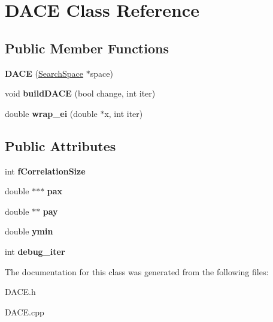 \hypertarget{class_d_a_c_e}{}\section{D\+A\+C\+E Class Reference}
\label{class_d_a_c_e}
\subsection*{Public Member Functions}
\begin{DoxyCompactItemize}
\item 
\hypertarget{class_d_a_c_e_ad065d6a5ee8dab7471f3f24982c25c81}{}{\bfseries D\+A\+C\+E} (\hyperlink{class_search_space}{Search\+Space} $\ast$space)\label{class_d_a_c_e_ad065d6a5ee8dab7471f3f24982c25c81}

\item 
\hypertarget{class_d_a_c_e_a2dab075ce7d90d2a0ddf239ad3af9166}{}void {\bfseries build\+D\+A\+C\+E} (bool change, int iter)\label{class_d_a_c_e_a2dab075ce7d90d2a0ddf239ad3af9166}

\item 
\hypertarget{class_d_a_c_e_aa5948a37a9acb0c8cfa511ff11e60ab2}{}double {\bfseries wrap\+\_\+ei} (double $\ast$x, int iter)\label{class_d_a_c_e_aa5948a37a9acb0c8cfa511ff11e60ab2}

\end{DoxyCompactItemize}
\subsection*{Public Attributes}
\begin{DoxyCompactItemize}
\item 
\hypertarget{class_d_a_c_e_a9b51bc799fddc33adc55d1554e9724b8}{}int {\bfseries f\+Correlation\+Size}\label{class_d_a_c_e_a9b51bc799fddc33adc55d1554e9724b8}

\item 
\hypertarget{class_d_a_c_e_a078309f70c44c2375e61eff0dfa01937}{}double $\ast$$\ast$$\ast$ {\bfseries pax}\label{class_d_a_c_e_a078309f70c44c2375e61eff0dfa01937}

\item 
\hypertarget{class_d_a_c_e_a63d1a43f2515a0ef3307d0fec42c19f0}{}double $\ast$$\ast$ {\bfseries pay}\label{class_d_a_c_e_a63d1a43f2515a0ef3307d0fec42c19f0}

\item 
\hypertarget{class_d_a_c_e_a5cdb4cbf1f85f1aaf2d4b07ff7d389bb}{}double {\bfseries ymin}\label{class_d_a_c_e_a5cdb4cbf1f85f1aaf2d4b07ff7d389bb}

\item 
\hypertarget{class_d_a_c_e_ab8ad79ef6d847b80d7b7adcc5a5d8cc5}{}int {\bfseries debug\+\_\+iter}\label{class_d_a_c_e_ab8ad79ef6d847b80d7b7adcc5a5d8cc5}

\end{DoxyCompactItemize}


The documentation for this class was generated from the following files\+:\begin{DoxyCompactItemize}
\item 
D\+A\+C\+E.\+h\item 
D\+A\+C\+E.\+cpp\end{DoxyCompactItemize}
